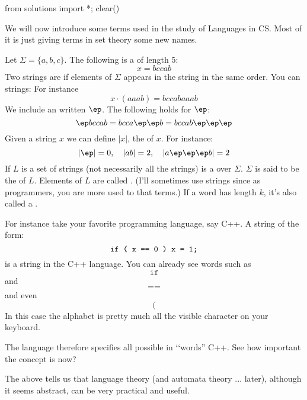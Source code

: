 \begin{python0}
from solutions import *; clear()
\end{python0}

We will now introduce some terms used in the study of Languages in
CS. Most of it is just giving terms in set theory some new names.

Let $\Sigma = \{a,b,c\}$. The following is a  of
length 5:
\[ x = bccab \]
Two strings are  if elements of $\Sigma$ appears in the
string in the same order. You can  strings: For
instance
\[ x \cdot (aaab) = bccabaaab \]
We include an  written $\ep$. The following
holds for $\ep$:
\[ \ep bccab = bcca\ep\ep b = bccab\ep\ep\ep \]
Given a string $x$ we can define $|x|$, the  of $x$.
For instance:
\[
  |\ep| = 0, \quad |ab| = 2, \quad |a\ep\ep\ep b| = 2
\]
If $L$ is a set of strings (not necessarily all the strings) is a
 over $\Sigma$. $\Sigma$ is said to be the
 of
$L$.
Elements of $L$ are called .
(I'll sometimes use strings since as programmers, you are more used to that terms.)
If a word has
length $k$, it's also called a .

For instance take your favorite programming language, say C++. A
string of the form:
\[
\text{\texttt{ if ( x == 0 ) x = 1; }}
\]
is a string in the C++ language.
You can already see words such as
\[
\texttt{if}
\]
and
\[
\texttt{==}
\]
and even
\[
\texttt{(}
\]
In this case the alphabet is pretty much all the
visible character on your keyboard.

The language therefore specifies all possible in \lq\lq words''
C++.
See how important the concept is now?

The above tells us that language theory (and automata theory ... later),
although it seems abstract, can be very practical and useful.

